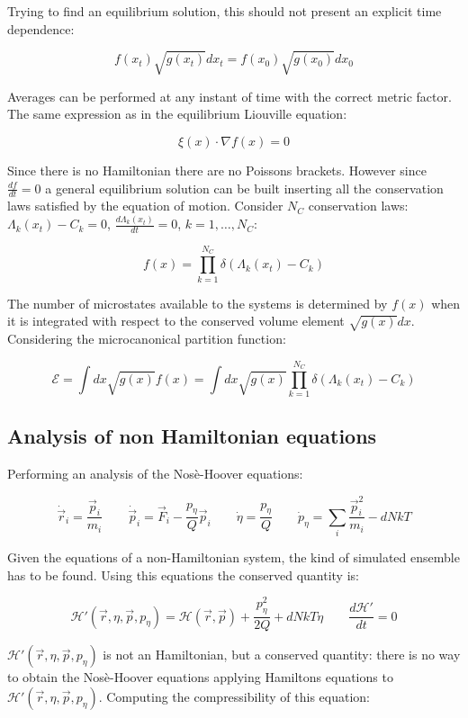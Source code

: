 	Trying to find an equilibrium solution, this should not present an explicit time dependence:

	$$f(x_t)\sqrt{g(x_t)}dx_t = f(x_0)\sqrt{g(x_0)}dx_0$$

	Averages can be performed at any instant of time with the correct metric factor.
	The same expression as in the equilibrium Liouville equation:

	$$\xi(x)\cdot\nabla f(x) = 0$$

	Since there is no Hamiltonian there are no Poissons brackets.
	However since $\frac{df}{dt} = 0$ a general equilibrium solution can be built inserting all the conservation laws satisfied by the equation of motion.
	Consider $N_C$ conservation laws: $\Lambda_k(x_t)-C_k = 0$, $\frac{d\Lambda_k(x_t)}{dt} = 0$, $k = 1, \dots, N_C$:

	$$f(x) = \prod\limits_{k=1}^{N_C}\delta(\Lambda_k(x_t) - C_k)$$

	The number of microstates available to the systems is determined by $f(x)$ when it is integrated with respect to the conserved volume element $\sqrt{g(x)}dx$.
	Considering the microcanonical partition function:

	$$\mathcal{E} = \int dx\sqrt{g(x)}f(x) = \int dx\sqrt{g(x)}\prod\limits_{k=1}^{N_C}\delta(\Lambda_k(x_t) -C_k)$$

	\subsection{Analysis of non Hamiltonian equations}
	Performing an analysis of the Nos\`e-Hoover equations:

	$$\dot{\vec{r}}_i = \frac{\vec{p}_i}{m_i}\qquad\dot{\vec{p}}_i = \vec{F}_i-\frac{p_\eta}{Q}\vec{p}_i\qquad\dot{\eta} = \frac{p_\eta}{Q}\qquad\dot{p}_\eta = \sum\limits_i\frac{\vec{p}_i^2}{m_i}-dNkT$$

	Given the equations of a non-Hamiltonian system, the kind of simulated ensemble has to be found.
	Using this equations the conserved quantity is:

	$$\mathcal{H}'(\vec{r}, \eta, \vec{p}, p_\eta) = \mathcal{H}(\vec{r}, \vec{p}) + \frac{p_\eta^2}{2Q} + dNkT\eta\qquad \frac{d\mathcal{H}'}{dt} = 0$$

	$\mathcal{H}'(\vec{r}, \eta, \vec{p}, p_\eta)$ is not an Hamiltonian, but a conserved quantity: there is no way to obtain the Nos\`e-Hoover equations applying Hamiltons equations to $\mathcal{H}'(\vec{r}, \eta, \vec{p}, p_\eta)$.
	Computing the compressibility of this equation:

